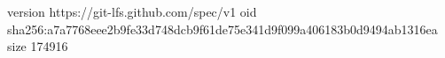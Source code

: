 version https://git-lfs.github.com/spec/v1
oid sha256:a7a7768eee2b9fe33d748dcb9f61de75e341d9f099a406183b0d9494ab1316ea
size 174916
